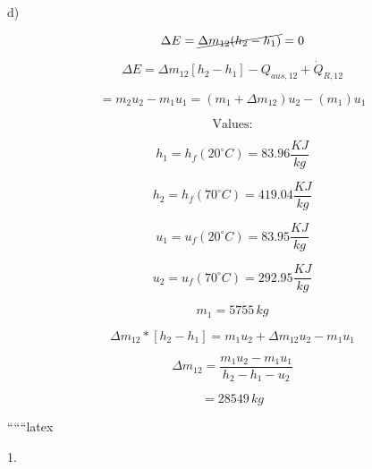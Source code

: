 d)

\[
\Delta E = \cancel{\Delta m_{12} (h_2 - h_1)} = 0
\]

\[
\Delta E = \Delta m_{12} \left[ h_2 - h_1 \right] - Q_{aus, 12} + \dot{Q}_{R, 12}
\]

\[
= m_2 u_2 - m_1 u_1 = (m_1 + \Delta m_{12}) u_2 - (m_1) u_1
\]

\[
\text{Values:}
\]

\[
h_1 = h_f (20^\circ C) = 83.96 \frac{KJ}{kg}
\]

\[
h_2 = h_f (70^\circ C) = 419.04 \frac{KJ}{kg}
\]

\[
u_1 = u_f (20^\circ C) = 83.95 \frac{KJ}{kg}
\]

\[
u_2 = u_f (70^\circ C) = 292.95 \frac{KJ}{kg}
\]

\[
m_1 = 5755 \, kg
\]

\[
\Delta m_{12} \ast [h_2 - h_1] = m_1 u_2 + \Delta m_{12} u_2 - m_1 u_1
\]

\[
\Delta m_{12} = \frac{m_1 u_2 - m_1 u_1}{h_2 - h_1 - u_2}
\]

\[
= 28549 \, kg
\]

``````latex


1.